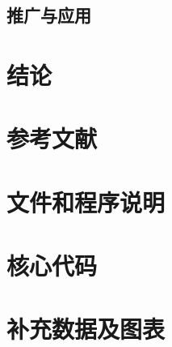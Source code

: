 \documentclass[withoutpreface,bwprint]{cumcmthesis}
\begin{document}
\subsection{推广与应用}
\vspace{0.06\textheight}

\section{结论}
\vspace{0.10\textheight}

\section*{参考文献}
\vspace{0.08\textheight}

\clearpage
\begin{appendices}
\section{文件和程序说明}
\vspace{0.10\textheight}

\section{核心代码}
\vspace{0.10\textheight}

\section{补充数据及图表}
\vspace{0.10\textheight}
\end{appendices}

\end{document}
